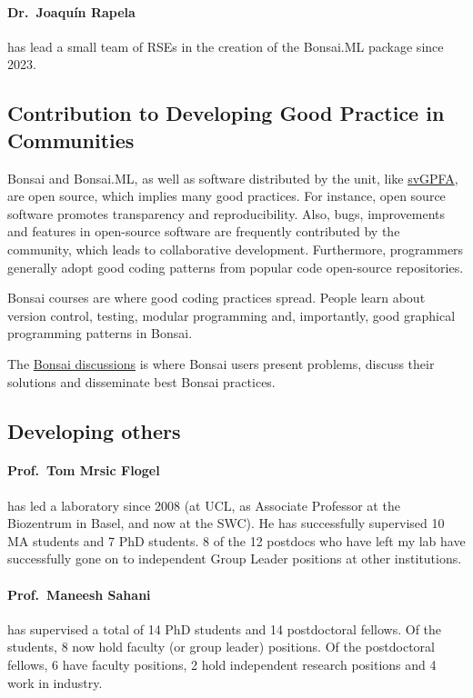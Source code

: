 \paragraph{Dr.~Joaqu\'{i}n Rapela} has lead a small team of RSEs in the
creation of the Bonsai.ML package since 2023.

\subsection*{Contribution to Developing Good Practice in Communities}

Bonsai and Bonsai.ML, as well as software distributed by the unit, like
\href{https://github.com/joacorapela/svGPFA}{svGPFA}, are open source, which
implies many good practices. For instance, open source software promotes
transparency and reproducibility. Also, bugs, improvements and features in
open-source software are frequently contributed by the community, which leads
to collaborative development. Furthermore, programmers generally adopt good
coding patterns from popular code open-source repositories.

Bonsai courses are where good coding practices spread. People learn about
version control, testing, modular programming and, importantly, good graphical
programming patterns in Bonsai.

The \href{https://github.com/orgs/bonsai-rx/discussions}{Bonsai discussions} is
where Bonsai users present problems, discuss their solutions and disseminate
best Bonsai practices.

\subsection*{Developing others}

\paragraph{Prof.~Tom Mrsic Flogel} has led a laboratory since 2008 (at UCL,
as Associate Professor at the Biozentrum in Basel, and now at the SWC). He has
successfully supervised 10 MA students and 7 PhD students. 8 of the 12 postdocs
who have left my lab have successfully gone on to independent Group Leader
positions at other institutions.

\paragraph{Prof.~Maneesh Sahani} has supervised a total of 14 PhD students and
14 postdoctoral fellows. Of the students, 8 now hold faculty (or group leader)
positions. Of the postdoctoral fellows, 6 have faculty positions, 2 hold
independent research positions and 4 work in industry.

